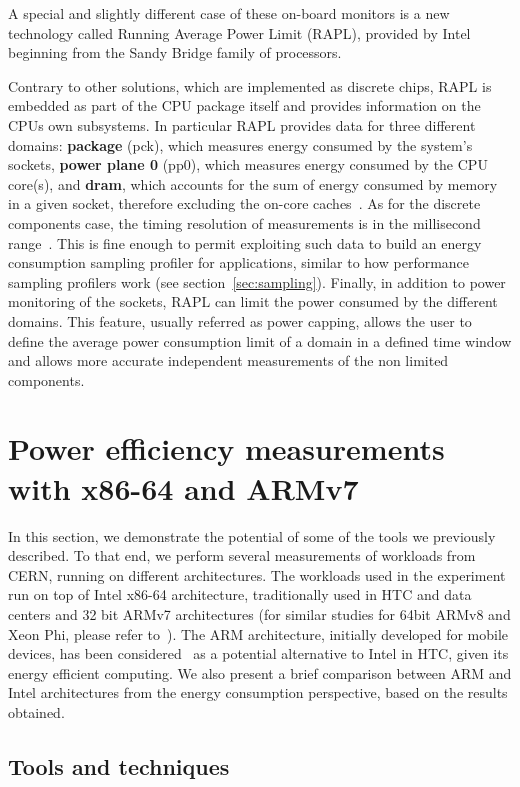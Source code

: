 A special and slightly different case of these on-board monitors
is a new technology called Running Average Power Limit (RAPL),
provided by Intel beginning from the Sandy Bridge family of processors.

Contrary to other solutions, which are implemented as discrete
chips, RAPL is embedded as part of the CPU package itself and
provides information on the CPUs own subsystems. In particular RAPL
provides data for three different domains: \textbf{package} (pck),
which measures energy consumed by the system's sockets, \textbf{power
plane 0} (pp0), which measures energy consumed by the CPU core(s),
and \textbf{dram}, which accounts for the sum of energy consumed
by memory in a given socket, therefore excluding the on-core
caches~\cite{INTELMAN}. As for the discrete components case, the
timing resolution of measurements is in the millisecond range~\cite{RAPL1}.
This is fine enough to permit exploiting such data to build an energy
consumption sampling profiler for applications, similar to how performance
sampling profilers work (see section~\ref{sec:sampling}).
Finally, in addition to power
monitoring of the sockets, RAPL can limit the power consumed by the
different domains. This feature, usually referred as power capping,
allows the user to define the average power consumption limit of a
domain in a defined time window and allows more accurate independent
measurements of the non limited components.

\section{Power efficiency measurements with x86-64 and ARMv7}

In this section, we demonstrate the potential of some of the
tools we previously described. To that end, we perform
several measurements of workloads from CERN, running on different
architectures. The workloads used in the experiment run on top of
Intel x86-64 architecture, traditionally used in HTC and data centers
and 32 bit ARMv7 architectures (for similar studies for 64bit ARMv8
and Xeon Phi, please refer to~\cite{ABD2014}). The ARM architecture,
initially developed for mobile devices, has been
considered~\cite{ACAT13ARM, CHEP13ARMPHI} as a potential alternative
to Intel in HTC, given its energy efficient computing. We also
present a brief comparison between ARM and Intel architectures from
the energy consumption perspective, based on the results obtained.

\subsection{Tools and techniques}

